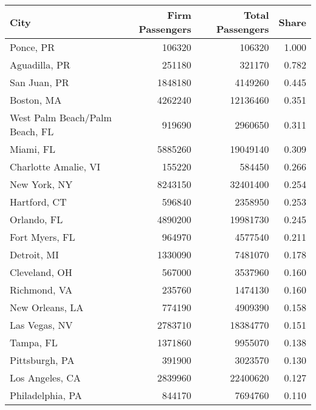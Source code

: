 
\begin{tabular}{lrrr}
\toprule
City & Firm Passengers & Total Passengers & Share\\
\midrule
Ponce, PR & 106320 & 106320 & 1.000\\
Aguadilla, PR & 251180 & 321170 & 0.782\\
San Juan, PR & 1848180 & 4149260 & 0.445\\
Boston, MA & 4262240 & 12136460 & 0.351\\
West Palm Beach/Palm Beach, FL & 919690 & 2960650 & 0.311\\
\addlinespace
Miami, FL & 5885260 & 19049140 & 0.309\\
Charlotte Amalie, VI & 155220 & 584450 & 0.266\\
New York, NY & 8243150 & 32401400 & 0.254\\
Hartford, CT & 596840 & 2358950 & 0.253\\
Orlando, FL & 4890200 & 19981730 & 0.245\\
\addlinespace
Fort Myers, FL & 964970 & 4577540 & 0.211\\
Detroit, MI & 1330090 & 7481070 & 0.178\\
Cleveland, OH & 567000 & 3537960 & 0.160\\
Richmond, VA & 235760 & 1474130 & 0.160\\
New Orleans, LA & 774190 & 4909390 & 0.158\\
\addlinespace
Las Vegas, NV & 2783710 & 18384770 & 0.151\\
Tampa, FL & 1371860 & 9955070 & 0.138\\
Pittsburgh, PA & 391900 & 3023570 & 0.130\\
Los Angeles, CA & 2839960 & 22400620 & 0.127\\
Philadelphia, PA & 844170 & 7694760 & 0.110\\
\bottomrule
\end{tabular}

